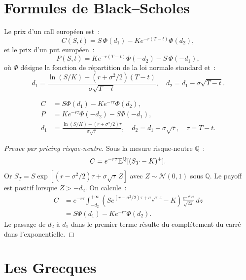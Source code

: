 \section{Formules de Black--Scholes}

\begin{theoreme}
\label{thm:formules_bs}
Le prix d'un call europ\'een est~:
\[
    C(S,t) = S\,\Phi(d_1) - Ke^{-r(T-t)}\Phi(d_2),
\]
et le prix d'un put europ\'een~:
\[
    P(S,t) = Ke^{-r(T-t)}\Phi(-d_2) - S\,\Phi(-d_1),
\]
o\`u $\Phi$ d\'esigne la fonction de r\'epartition de la loi normale
standard et~:
\[
    d_1 = \frac{\ln(S/K) + (r + \sigma^2/2)(T-t)}{\sigma\sqrt{T-t}}, \quad
    d_2 = d_1 - \sigma\sqrt{T-t}.
\]
\end{theoreme}

\begin{formules}[title=\textbf{Formules de Black--Scholes --- R\'ecapitulatif}]
\begin{align*}
    C &= S\Phi(d_1) - Ke^{-r\tau}\Phi(d_2), \\
    P &= Ke^{-r\tau}\Phi(-d_2) - S\Phi(-d_1), \\
    d_1 &= \frac{\ln(S/K) + (r + \sigma^2/2)\tau}{\sigma\sqrt{\tau}}, \quad
    d_2 = d_1 - \sigma\sqrt{\tau}, \quad \tau = T - t.
\end{align*}
\end{formules}

\begin{proof}[Preuve par pricing risque-neutre]
Sous la mesure risque-neutre $\mathbb{Q}$~:
\[
    C = e^{-r\tau}\mathbb{E}^\mathbb{Q}[(S_T - K)^+].
\]
Or $S_T = S\exp\!\left[(r - \sigma^2/2)\tau + \sigma\sqrt{\tau}\,Z\right]$
avec $Z \sim \mathcal{N}(0,1)$ sous $\mathbb{Q}$. Le payoff est positif
lorsque $Z > -d_2$. On calcule~:
\begin{align*}
    C &= e^{-r\tau}\int_{-d_2}^{+\infty}
         \left(Se^{(r-\sigma^2/2)\tau + \sigma\sqrt{\tau}\,z} - K\right)
         \frac{e^{-z^2/2}}{\sqrt{2\pi}}\,dz \\
      &= S\Phi(d_1) - Ke^{-r\tau}\Phi(d_2).
\end{align*}
Le passage de $d_2$ \`a $d_1$ dans le premier terme r\'esulte du
compl\'etement du carr\'e dans l'exponentielle.
\end{proof}

\section{Les Grecques}

